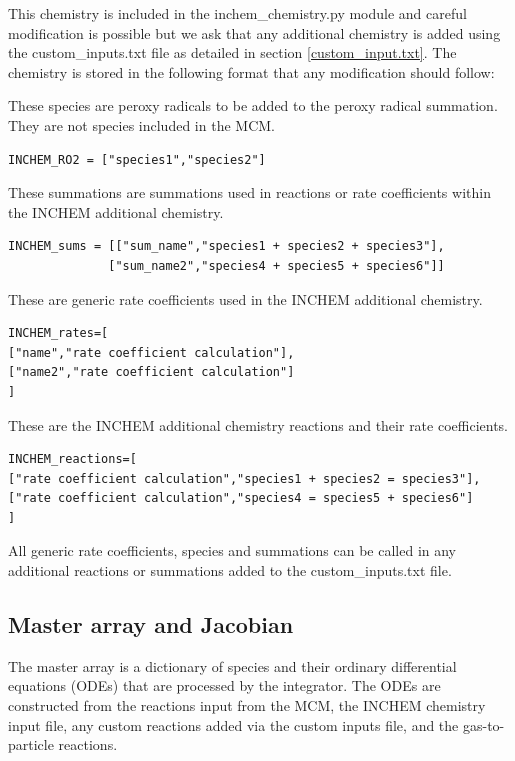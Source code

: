 \documentclass[a4paper]{refart}
\begin{document}
This chemistry is included in the inchem\_chemistry.py module and careful modification is possible but we ask that any additional chemistry is added using the custom\_inputs.txt file as detailed in section \ref{custom_input.txt}. The chemistry is stored in the following format that any modification should follow:

These species are peroxy radicals to be added to the peroxy radical summation. They are not species included in the MCM.
\begin{verbatim}
INCHEM_RO2 = ["species1","species2"]
\end{verbatim}

These summations are summations used in reactions or rate coefficients within the INCHEM additional chemistry.
\begin{verbatim}
INCHEM_sums = [["sum_name","species1 + species2 + species3"],
              ["sum_name2","species4 + species5 + species6"]]
\end{verbatim}

These are generic rate coefficients used in the INCHEM additional chemistry.
\begin{verbatim}
INCHEM_rates=[
["name","rate coefficient calculation"],
["name2","rate coefficient calculation"]
]
\end{verbatim}

These are the INCHEM additional chemistry reactions and their rate coefficients.
\begin{verbatim}
INCHEM_reactions=[
["rate coefficient calculation","species1 + species2 = species3"],
["rate coefficient calculation","species4 = species5 + species6"]
]
\end{verbatim}

All generic rate coefficients, species and summations can be called in any additional reactions or summations added to the custom\_inputs.txt file.

\subsection{Master array and Jacobian}
The master array is a dictionary of species and their ordinary differential equations (ODEs) that are processed by the integrator. The ODEs are constructed from the reactions input from the MCM, the INCHEM chemistry input file, any custom reactions added via the custom inputs file, and the gas-to-particle reactions. 
\end{document}
